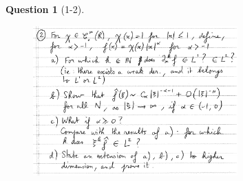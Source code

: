\documentclass[11pt]{article}
\theoremstyle{plain}
\theoremstyle{quest}
\newtheorem*{question}{Question}
\begin{document}
\begin{question}[1-2]
\hfill
\begin{figure}[h!]
  \centering
    \includegraphics[width=0.7\textwidth]{pde2-1-2.png}
\end{figure}
\end{question}
\end{document}
